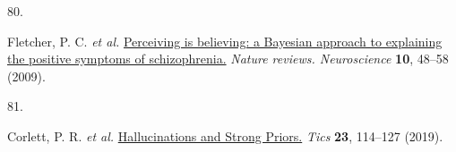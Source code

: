 \documentclass[
]{article}
\newlength{\cslhangindent}
\newlength{\csllabelwidth}
\newlength{\cslentryspacingunit} %
\newenvironment{CSLReferences}[2] %
 {%
  \setlength{\parindent}{0pt}
  \ifodd #1
  \let\oldpar\par
  \def\par{\hangindent=\cslhangindent\oldpar}
  \fi
  \setlength{\parskip}{#2\cslentryspacingunit}
 }%
 {}
\newcommand{\CSLLeftMargin}[1]{\parbox[t]{\csllabelwidth}{#1}}
\newcommand{\CSLRightInline}[1]{\parbox[t]{\linewidth - \csllabelwidth}{#1}\break}
\begin{document}
\begin{CSLReferences}{0}{0}
\leavevmode{}%
\CSLLeftMargin{80. }%
\CSLRightInline{Fletcher, P. C. \emph{et al.}
\href{https://doi.org/10.1038/nrn2536}{{Perceiving is believing: a
Bayesian approach to explaining the positive symptoms of
schizophrenia.}} \emph{Nature reviews. Neuroscience} \textbf{10}, 48--58
(2009).}

\leavevmode{}%
\CSLLeftMargin{81. }%
\CSLRightInline{Corlett, P. R. \emph{et al.}
\href{https://doi.org/10.1016/j.tics.2018.12.001}{{Hallucinations and
Strong Priors.}} \emph{Tics} \textbf{23}, 114--127 (2019).}

\end{CSLReferences}
\end{document}

